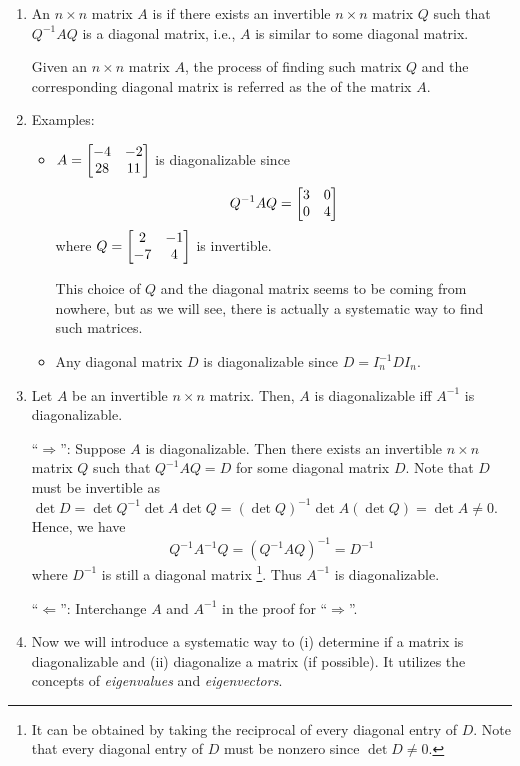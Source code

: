 \begin{enumerate}
\item An \(n\times n\) matrix \(A\) is  if there exists an
invertible \(n\times n\) matrix \(Q\) such that \(Q^{-1}AQ\) is a diagonal
matrix, i.e., \(A\) is similar to some diagonal matrix.

Given an \(n\times n\) matrix \(A\), the process of finding such matrix \(Q\)
and the corresponding diagonal matrix is referred as the 
of the matrix \(A\).

\item Examples:
\begin{itemize}
\item \(A=\mqty[-4&-2\\ 28&11]\) is diagonalizable since
\[
Q^{-1}AQ=\mqty[\dmat[0]{3,4}]
\]
where \(Q=\mqty[2&-1\\ -7&4]\) is invertible. \begin{note}
This choice of \(Q\) and the diagonal matrix seems to be coming
from nowhere, but as we will see, there is actually a
systematic way to find such matrices.
\end{note}
\item Any diagonal matrix \(D\) is diagonalizable since
\(D=I_n^{-1}DI_n\).
\end{itemize}

\item \label{it:inv-diag} Let \(A\) be an invertible \(n\times n\)
matrix. Then, \(A\) is diagonalizable iff \(A^{-1}\) is diagonalizable.

\begin{pf}
``\(\Rightarrow\)'': Suppose \(A\) is diagonalizable. Then
there exists an invertible \(n\times n\) matrix \(Q\) such
that \(Q^{-1}AQ=D\) for some diagonal matrix \(D\). Note that \(D\) must be invertible as \(\det D=\det Q^{-1}\det A\det Q=(\det Q)^{-1}\det A(\det Q)=\det A\ne 0\). Hence, we have
\[
Q^{-1}A^{-1}Q=(Q^{-1}AQ)^{-1}=D^{-1}
\]
where \(D^{-1}\) is still a diagonal matrix \footnote{It can be obtained
by taking the reciprocal of every diagonal entry of \(D\). Note that every
diagonal entry of \(D\) must be nonzero since \(\det D\ne 0\).}. Thus
\(A^{-1}\) is diagonalizable.

``\(\Leftarrow\)'': Interchange \(A\) and \(A^{-1}\) in the proof for ``\(\Rightarrow\)''.
\end{pf}

\item Now we will introduce a systematic way to (i) determine if a matrix is
diagonalizable and (ii) diagonalize a matrix (if possible). It utilizes the
concepts of \emph{eigenvalues} and \emph{eigenvectors}.


\end{enumerate}
